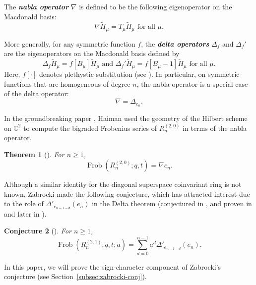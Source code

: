 \documentclass[11pt, noadjust, reqno]{amsart}
\newtheorem{theorem}{Theorem}[section]
\newtheorem{conjecture}[theorem]{Conjecture}
\theoremstyle{definition}
\theoremstyle{remark}
\numberwithin{equation}{section}
\newcommand{\0}{\emptyset}
\newcommand{\C}{\mathbb{C}}
\DeclareMathOperator{\Frob}{Frob}
\newcommand{\newword}[1]{\emph{\textbf{#1}}}
\begin{document}
The \newword{nabla operator} $\nabla$ \cite{BergeronGarsia} is defined to be the following eigenoperator on the Macdonald basis: 
\begin{equation}\label{eq:nabla-defintion}
    \nabla \tilde{H}_\mu = T_\mu \tilde{H}_\mu \text{ for all $\mu$}.
\end{equation}

More generally, for any symmetric function $f$, the \newword{delta operators} $\Delta_f$ and $\Delta_f'$ \cite{HaglundRemmelWilson2018, BergeronGarsiaHaimanTesler} are the eigenoperators on the Macdonald basis defined by 
\begin{equation*}
    \Delta_f \tilde{H}_\mu = f[B_\mu]\tilde{H}_\mu \text{ and } \Delta_f' \tilde{H}_\mu = f[B_\mu-1]\tilde{H}_\mu \text{ for all $\mu$}.
\end{equation*}
Here, $f[\cdot]$ denotes plethystic substitution (see \cite{HaimanCDM}).
In particular, on symmetric functions that are homogeneous of degree $n$, the nabla operator is a special case of the delta operator: 
\[
\nabla = \Delta_{e_n}.
\]

In the groundbreaking paper \cite{Haiman2002}, Haiman used the geometry of the Hilbert scheme on $\C^2$ to compute the bigraded Frobenius series of $R_n^{(2,0)}$ in terms of the nabla operator.

\begin{theorem}[\cite{Haiman2002}]\label{thm:haiman}
    For $n \geq 1$,
    \begin{equation*}
        \Frob(R_n^{(2,0)};q,t) =  \nabla e_n.
    \end{equation*}
\end{theorem}

Although a similar identity for the diagonal superspace coinvariant ring is not known, Zabrocki made the following conjecture, which has attracted interest due to the role of $\Delta'_{e_{n-1-d}}(e_n)$ in the Delta theorem (conjectured in \cite{HaglundRemmelWilson2018}, and proven in \cite{DAdderioMellit} and later in \cite{BHMPS-Delta}).
\begin{conjecture}[\cite{Zabrocki2019}]\label{conj:zabrocki}
For $n \geq 1$,
    \begin{equation*}
        \Frob(R_n^{(2,1)}; q,t; a) = \sum_{d=0}^{n-1} a^d\Delta'_{e_{n-1-d}}(e_n).
    \end{equation*}
\end{conjecture}
In this paper, we will prove the sign-character component of Zabrocki's conjecture (see Section~\ref{subsec:zabrocki-conj}).
\end{document}
